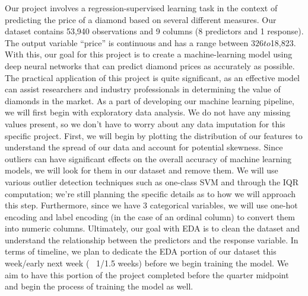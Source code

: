 \documentclass[conference]{IEEEtran}
\begin{document}
Our project involves a regression-supervised learning task in the context of predicting the price of a diamond based on several different measures. Our dataset contains 53,940 observations and 9 columns (8 predictors and 1 response). The output variable “price” is continuous and has a range between $326 to $18,823. With this, our goal for this project is to create a machine-learning model using deep neural networks that can predict diamond prices as accurately as possible. The practical application of this project is quite significant, as an effective model can assist researchers and industry professionals in determining the value of diamonds in the market. 
As a part of developing our machine learning pipeline, we will first begin with exploratory data analysis. We do not have any missing values present, so we don’t have to worry about any data imputation for this specific project. First, we will begin by plotting the distribution of our features to understand the spread of our data and account for potential skewness. Since outliers can have significant effects on the overall accuracy of machine learning models, we will look for them in our dataset and remove them. We will use various outlier detection techniques such as one-class SVM and through the IQR computation; we're still planning the specific details as to how we will approach this step. Furthermore, since we have 3 categorical variables, we will use one-hot encoding and label encoding (in the case of an ordinal column) to convert them into numeric columns. Ultimately, our goal with EDA is to clean the dataset and understand the relationship between the predictors and the response variable. In terms of timeline, we plan to dedicate the EDA portion of our dataset this week/early next week (~ 1/1.5 weeks) before we begin training the model. We aim to have this portion of the project completed before the quarter midpoint and begin the process of training the model as well.
\end{document}
